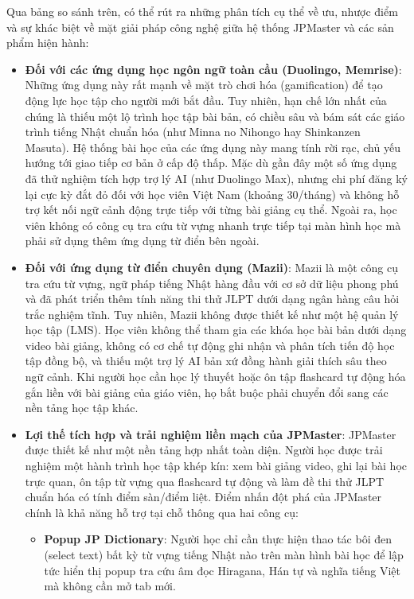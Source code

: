 \documentclass[../DoAn.tex]{subfiles}
\begin{document}
Qua bảng so sánh trên, có thể rút ra những phân tích cụ thể về ưu, nhược điểm và sự khác biệt về mặt giải pháp công nghệ giữa hệ thống JPMaster và các sản phẩm hiện hành:

\begin{itemize}
    \item \textbf{Đối với các ứng dụng học ngôn ngữ toàn cầu (Duolingo, Memrise)}: Những ứng dụng này rất mạnh về mặt trò chơi hóa (gamification) để tạo động lực học tập cho người mới bắt đầu. Tuy nhiên, hạn chế lớn nhất của chúng là thiếu một lộ trình học tập bài bản, có chiều sâu và bám sát các giáo trình tiếng Nhật chuẩn hóa (như Minna no Nihongo hay Shinkanzen Masuta). Hệ thống bài học của các ứng dụng này mang tính rời rạc, chủ yếu hướng tới giao tiếp cơ bản ở cấp độ thấp. Mặc dù gần đây một số ứng dụng đã thử nghiệm tích hợp trợ lý AI (như Duolingo Max), nhưng chi phí đăng ký lại cực kỳ đắt đỏ đối với học viên Việt Nam (khoảng $30$/tháng) và không hỗ trợ kết nối ngữ cảnh động trực tiếp với từng bài giảng cụ thể. Ngoài ra, học viên không có công cụ tra cứu từ vựng nhanh trực tiếp tại màn hình học mà phải sử dụng thêm ứng dụng từ điển bên ngoài.
    \item \textbf{Đối với ứng dụng từ điển chuyên dụng (Mazii)}: Mazii là một công cụ tra cứu từ vựng, ngữ pháp tiếng Nhật hàng đầu với cơ sở dữ liệu phong phú và đã phát triển thêm tính năng thi thử JLPT dưới dạng ngân hàng câu hỏi trắc nghiệm tĩnh. Tuy nhiên, Mazii không được thiết kế như một hệ quản lý học tập (LMS). Học viên không thể tham gia các khóa học bài bản dưới dạng video bài giảng, không có cơ chế tự động ghi nhận và phân tích tiến độ học tập đồng bộ, và thiếu một trợ lý AI bản xứ đồng hành giải thích sâu theo ngữ cảnh. Khi người học cần học lý thuyết hoặc ôn tập flashcard tự động hóa gắn liền với bài giảng của giáo viên, họ bắt buộc phải chuyển đổi sang các nền tảng học tập khác.
    \item \textbf{Lợi thế tích hợp và trải nghiệm liền mạch của JPMaster}: JPMaster được thiết kế như một nền tảng hợp nhất toàn diện. Người học được trải nghiệm một hành trình học tập khép kín: xem bài giảng video, ghi lại bài học trực quan, ôn tập từ vựng qua flashcard tự động và làm đề thi thử JLPT chuẩn hóa có tính điểm sàn/điểm liệt. Điểm nhấn đột phá của JPMaster chính là khả năng hỗ trợ tại chỗ thông qua hai công cụ:
    \begin{itemize}
        \item \textbf{Popup JP Dictionary}: Người học chỉ cần thực hiện thao tác bôi đen (select text) bất kỳ từ vựng tiếng Nhật nào trên màn hình bài học để lập tức hiển thị popup tra cứu âm đọc Hiragana, Hán tự và nghĩa tiếng Việt mà không cần mở tab mới.

\end{itemize}
\end{itemize}
\end{document}
